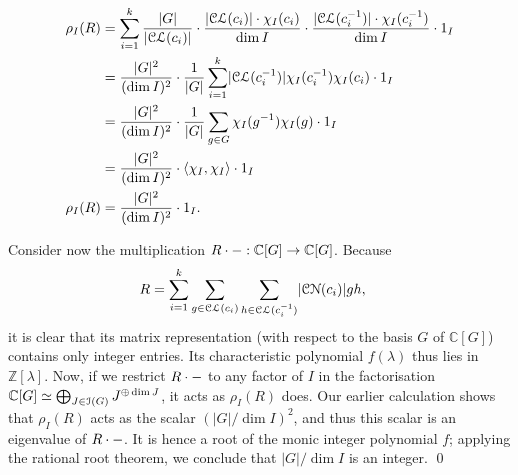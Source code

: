 \begin{align*}
  \rho_I (R)
  &= \sum_{i = 1}^{k}
    \frac{\lvert G \rvert}{\lvert \operatorname{\mathcal{CL}}(c_i) \rvert}
    \cdot \frac{\lvert \operatorname{\mathcal{CL}}(c_i) \rvert \cdot \chi_I (c_i)}{\dim I}
    \cdot \frac{\lvert \operatorname{\mathcal{CL}}(c_i^{-1}) \rvert \cdot \chi_I (c_i^{-1})}{\dim I}
    \cdot 1_I
  \\
  &= \frac{\lvert G \rvert^2}{(\dim I)^2}
  \cdot \frac{1}{\lvert G \rvert} \sum_{i = 1}^{k}
    \lvert \operatorname{\mathcal{CL}}(c_i^{-1}) \rvert \chi_I (c_i^{-1}) \chi_I (c_i)
    \cdot 1_I
  \\
  &= \frac{\lvert G \rvert^2}{(\dim I)^2}
  \cdot \frac{1}{\lvert G \rvert} \sum_{g \in G}
    \chi_I (g^{-1}) \chi_I (g)
    \cdot 1_I
  \\
  &= \frac{\lvert G \rvert^2}{(\dim I)^2}
  \cdot \langle \chi_I, \chi_I \rangle
  \cdot 1_I
  \\
  \rho_I (R)
  &= \frac{\lvert G \rvert^2}{(\dim I)^2}
  \cdot 1_I
  .
\end{align*}
\par Consider now the multiplication $R \cdot {-} : \mathbb{C}[G] \to \mathbb{C}[G]$. Because
\begin{align*}
  R
  &= \sum_{i = 1}^{k} \sum_{g \in \operatorname{\mathcal{CL}}(c_i)} \sum_{h \in \operatorname{\mathcal{CL}}(c_i^{-1})}
    \lvert \operatorname{\mathcal{CN}}(c_i) \rvert
    g h
  ,
\end{align*}
it is clear that its matrix representation (with respect to the basis $G$ of $\mathbb{C}[G]$) contains only integer entries. Its characteristic polynomial $f(\lambda)$ thus lies in $\mathbb{Z}[\lambda]$. Now, if we restrict $R \cdot {-}$ to any factor of $I$ in the factorisation $\mathbb{C}[G] \simeq \bigoplus_{J \in \operatorname{\mathcal{I}}(G)} J^{\oplus \dim J}$, it acts as $\rho_I (R)$ does. Our earlier calculation shows that $\rho_I (R)$ acts as the scalar $
  \left( \lvert G \rvert / {\dim I} \right)^2
$, and thus this scalar is an eigenvalue of $R \cdot {-}$. It is hence a root of the monic integer polynomial $f$; applying the rational root theorem, we conclude that $\lvert G \rvert / {\dim I}$ is an integer. \qed
